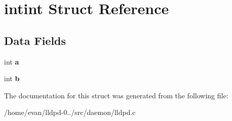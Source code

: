 \section{intint \-Struct \-Reference}
\label{structintint}
\subsection*{\-Data \-Fields}
\begin{DoxyCompactItemize}
\item 
int {\bfseries a}\label{structintint_aa4c2a5552e9bc49b1816ff532f558c74}

\item 
int {\bfseries b}\label{structintint_a148e3876077787926724625411d6e7a9}

\end{DoxyCompactItemize}


\-The documentation for this struct was generated from the following file\-:\begin{DoxyCompactItemize}
\item 
/home/evan/lldpd-\/0../src/daemon/lldpd.\-c\end{DoxyCompactItemize}
